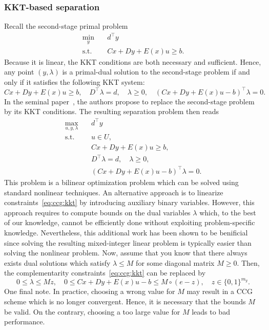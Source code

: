
\subsubsection*{KKT-based separation}

Recall the second-stage primal problem
\begin{subequations}
    \begin{align*}
        \min_{y} \quad & d^\top y \\
        \text{s.t.} \quad & Cx + Dy + E(x)u \ge b.
    \end{align*}
\end{subequations}
Because it is linear, the KKT conditions are both necessary and sufficient.
Hence, any point $(y,\lambda)$ is a primal-dual solution to the second-stage
problem if and only if it satisfies the following KKT system:
\begin{equation*}
    Cx + Dy + E(x)u \ge b, \quad 
    D^\top \lambda = d, \quad 
    \lambda\ge 0, \quad
    (Cx + Dy + E(x)u - b)^\top \lambda = 0.
\end{equation*}
In the seminal paper~\textcite{Zeng2013}, the authors propose to replace the
second-stage problem by its KKT conditions. The resulting separation problem
then reads 
\begin{subequations}
    \begin{align}
        \max_{u,y,\lambda} \quad & d^\top y \\
        \text{s.t.} \quad & u\in U, \\
        & Cx + Dy + E(x)u \ge b, \\ 
        & D^\top \lambda = d, \quad \lambda\ge 0, \\
        & (Cx + Dy + E(x)u - b)^\top \lambda = 0. \label{eq:ccg:kkt}
    \end{align}
\end{subequations}
This problem is a bilinear optimization problem which can be solved using
standard nonlinear techniques. An alternative approach is to linearize
constraints~\eqref{eq:ccg:kkt} by introducing auxiliary binary variables.
However, this approach requires to compute bounds on the dual variables
$\lambda$ which, to the best of our knowledge, cannot be efficiently done
without exploiting problem-specific knowledge. Nevertheless, this additional
work has been shown to be benificial since solving the resulting mixed-integer
linear problem is typically easier than solving the nonlinear problem. Now,
assume that you know that there always exists dual solutions which satisfy
$\lambda \le M$ for some diagonal matrix $M \ge 0$. Then, the complementarity
constraints~\eqref{eq:ccg:kkt} can be replaced by
\begin{equation*}
    0 \le \lambda \le Mz, \quad 
    0 \le Cx + Dy + E(x)u - b \le M\circ(e - z), \quad 
    z\in\{0,1\}^{m_y}.
\end{equation*}
One final note. In practice, choosing a wrong value for $M$ may result in a
CCG scheme which is no longer convergent. Hence, it is necessary that the
bounds $M$ be valid. On the contrary, choosing a too large value for $M$ leads
to bad performance. 

